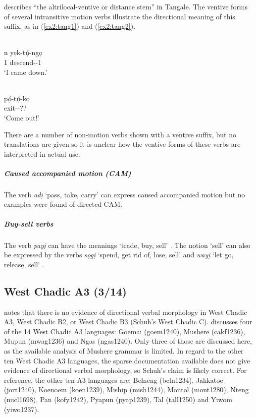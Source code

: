 \citet[46--47]{jungraithmayrDictionaryTangaleLanguage1991} describes ``the altrilocal-ventive or distance stem'' in Tangale. The ventive forms of several intransitive motion verbs illustrate the directional meaning of this suffix, as in (\ref{ex2:tang1}) and (\ref{ex2:tang2}). 

\ea\label{ex2:tang1}
 \\
\gll n yẹk-tụ́-ngọ	\\
1 descend--1	\\
\glt `I came down.'

\ex\label{ex2:tang2}
 \\
\gll pọ́-tụ́-kọ	\\
exit--??	\\
\glt `Come out!'
\z 

There are a number of non-motion verbs shown with a ventive suffix, but no translations are given so it is unclear how the ventive forms of these verbs are interpreted in actual use. 

\subparagraph{Caused accompanied motion (CAM)}



The verb \textit{adị} `pass, take, carry' can express caused accompanied motion but no examples were found of directed CAM.

\subparagraph{Buy-sell verbs}



The verb \textit{payị} can have the meanings `trade, buy, sell' \citep[129]{jungraithmayrDictionaryTangaleLanguage1991}. The notion `sell' can also be expressed by the verbs \textit{sọgị} `spend, get rid of, lose, sell' and \textit{wayị} `let go, release, sell' \citep[146, 161]{jungraithmayrDictionaryTangaleLanguage1991}.

\subsection{West Chadic A3 (3/14)}

\citet[308]{schuhChadicCornucopia2017} notes that there is no evidence of directional verbal morphology in West Chadic A3, West Chadic B2, or West Chadic B3 (Schuh’s West Chadic C). \citet{schuhChadicCornucopia2017} discusses four of the 14 West Chadic A3 languages: Goemai (goem1240), Mushere (cakf1236), Mupun (mwag1236) and Ngas (ngas1240). Only three of those are discussed here, as the available analysis of Mushere grammar is limited. In regard to the other ten West Chadic A3 languages, the sparse documentation available does not give evidence of directional verbal morphology, so Schuh's claim is likely correct. For reference, the other ten A3 languages are: Belneng (beln1234), Jakkatoe (jort1240), Koenoem (koen1239), Miship (mish1244), Montol (mont1280), Nteng (nucl1698), Pan (kofy1242), Pyapun (pyap1239), Tal (tall1250) and Yiwom (yiwo1237). 


